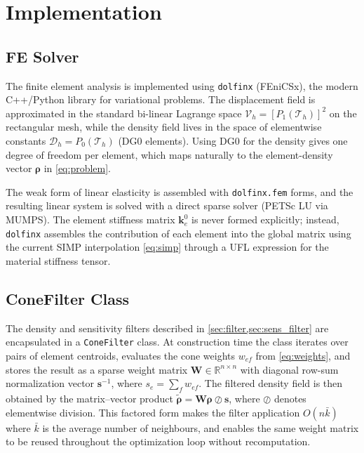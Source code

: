\documentclass[11pt,a4paper]{article}
\begin{document}
\section{Implementation}
\label{sec:implementation}

\subsection{FE Solver}

The finite element analysis is implemented using \texttt{dolfinx}
(FEniCSx), the modern C++/Python library for variational problems.  The
displacement field is approximated in the standard bi-linear Lagrange
space $\mathcal{V}_h = [P_1(\mathcal{T}_h)]^2$ on the rectangular mesh,
while the density field lives in the space of elementwise constants
$\mathcal{D}_h = P_0(\mathcal{T}_h)$ (DG0 elements).  Using DG0 for the
density gives one degree of freedom per element, which maps naturally to
the element-density vector $\boldsymbol{\rho}$ in \cref{eq:problem}.

The weak form of linear elasticity is assembled with \texttt{dolfinx.fem}
forms, and the resulting linear system is solved with a direct sparse
solver (PETSc LU via MUMPS).  The element stiffness matrix $\mathbf{k}_e^0$
is never formed explicitly; instead, \texttt{dolfinx} assembles the
contribution of each element into the global matrix using the current SIMP
interpolation \cref{eq:simp} through a UFL expression for the material
stiffness tensor.

\subsection{ConeFilter Class}

The density and sensitivity filters described in
\cref{sec:filter,sec:sens_filter} are encapsulated in a \texttt{ConeFilter}
class.  At construction time the class iterates over pairs of element
centroids, evaluates the cone weights $w_{ef}$ from \cref{eq:weights}, and
stores the result as a sparse weight matrix $\mathbf{W} \in \mathbb{R}^{n
\times n}$ with diagonal row-sum normalization vector $\mathbf{s}^{-1}$,
where $s_e = \sum_f w_{ef}$.  The filtered density field is then obtained
by the matrix--vector product $\tilde{\boldsymbol{\rho}} = \mathbf{W}
\boldsymbol{\rho} \oslash \mathbf{s}$, where $\oslash$ denotes elementwise
division.  This factored form makes the filter application $O(n \bar{k})$
where $\bar{k}$ is the average number of neighbours, and enables the same
weight matrix to be reused throughout the optimization loop without
recomputation.
\end{document}
